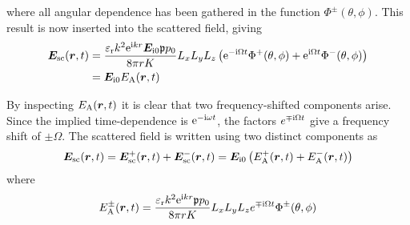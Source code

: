 \documentclass[11pt,twoside]{eitExjobb}
\begin{document}
	where all angular dependence has been gathered in the function $\Phi^\pm (\theta,\phi)$. This result is now inserted into the scattered field, giving
	\begin{equation*}
	\begin{split}
		\bm{E}_{\mathrm{sc}}(\bm{r},t) &= \frac{\varepsilon_{\mathrm{r}}k^2 \mathrm{e}^{\mathrm{i} kr} \bm{E}_{\mathrm{i}0} \mathfrak{p} p_0}{8\pi r K} L_{x} L_{y} L_{z} \left( \mathrm{e}^{-\mathrm{i} \Omega t} \Phi^+ (\theta,\phi)  + \mathrm{e}^{\mathrm{i} \Omega t} \Phi^- (\theta,\phi) \right) \\
		&= \bm{E}_{\mathrm{i}0} E_{\mathrm{A}}(\bm{r},t)
	\end{split}
	\end{equation*}
	
	By inspecting $E_{\mathrm{A}}(\bm{r},t)$ it is clear that two frequency-shifted components arise. Since the implied time-dependence is $\mathrm{e}^{-\mathrm{i} \omega t}$, the factors $e^{\mp \mathrm{i} \Omega t}$ give a frequency shift of $\pm \Omega$. The scattered field is written using two distinct components as
	\begin{equation*}
	\bm{E}_{\mathrm{sc}} (\bm{r},t) = \bm{E}_{\mathrm{sc}}^+ (\bm{r},t) + \bm{E}_{\mathrm{sc}}^- (\bm{r},t) = \bm{E}_{\mathrm{i}0} \left( E_{\mathrm{A}}^+ (\bm{r},t) + E_{\mathrm{A}}^- (\bm{r},t) \right)
	\end{equation*}
	where
	\begin{equation*}
		E_{\mathrm{A}}^\pm (\bm{r},t) = \frac{\varepsilon_{\mathrm{r}}k^2 \mathrm{e}^{\mathrm{i} kr} \mathfrak{p} p_0}{8\pi r K} L_{x} L_{y} L_{z} e^{\mp \mathrm{i} \Omega t} \Phi^\pm (\theta,\phi)
	\end{equation*}
	
\end{document}
